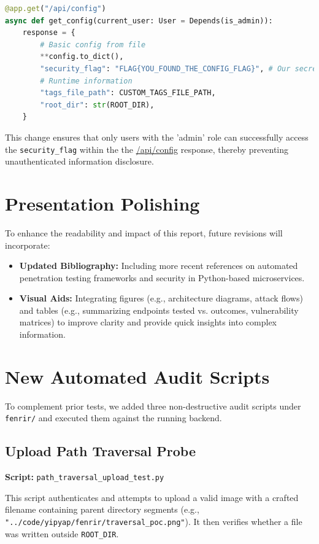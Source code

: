 \documentclass{article}
\begin{document}
\begin{lstlisting}[language=Python, caption=Security Fix in \texttt{app/main.py}]
@app.get("/api/config")
async def get_config(current_user: User = Depends(is_admin)):
    response = {
        # Basic config from file
        **config.to_dict(),
        "security_flag": "FLAG{YOU_FOUND_THE_CONFIG_FLAG}", # Our secret flag
        # Runtime information
        "tags_file_path": CUSTOM_TAGS_FILE_PATH,
        "root_dir": str(ROOT_DIR),
    }
\end{lstlisting}

This change ensures that only users with the 'admin' role can successfully access the \texttt{security\_flag} within the the \url{/api/config} response, thereby preventing unauthenticated information disclosure.




\section{Presentation Polishing}
To enhance the readability and impact of this report, future revisions will incorporate:
\begin{itemize}
    \item \textbf{Updated Bibliography:} Including more recent references on automated penetration testing frameworks and security in Python-based microservices.
    \item \textbf{Visual Aids:} Integrating figures (e.g., architecture diagrams, attack flows) and tables (e.g., summarizing endpoints tested vs. outcomes, vulnerability matrices) to improve clarity and provide quick insights into complex information.
\end{itemize}

\section{New Automated Audit Scripts}
To complement prior tests, we added three non-destructive audit scripts under \texttt{fenrir/} and executed them against the running backend.

\subsection{Upload Path Traversal Probe}
\textbf{Script:} \texttt{path\_traversal\_upload\_test.py}

This script authenticates and attempts to upload a valid image with a crafted filename containing parent directory segments (e.g., \texttt{"../code/yipyap/fenrir/traversal\_poc.png"}). It then verifies whether a file was written outside \texttt{ROOT\_DIR}.
\end{document}
